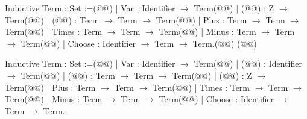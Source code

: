 Inductive Term : Set :=(@\vspace{-0.04cm}@)
| Var : Identifier $\rightarrow$ Term(@\vspace{-0.04cm}@)
| (@@) : Z $\rightarrow$ Term(@\vspace{-0.04cm}@)
| (@@) : Term $\rightarrow$ Term $\rightarrow$ Term(@\vspace{-0.04cm}@)
| Plus : Term $\rightarrow$ Term $\rightarrow$ Term(@\vspace{-0.04cm}@)
| Times : Term $\rightarrow$ Term $\rightarrow$ Term(@\vspace{-0.04cm}@)
| Minus : Term $\rightarrow$ Term $\rightarrow$ Term(@\vspace{-0.04cm}@)
| Choose : Identifier $\rightarrow$ Term $\rightarrow$ Term.(@\vspace{-0.04cm}@)
(@\vspace{-0.04cm}@)

Inductive Term : Set :=(@\vspace{-0.04cm}@)
| Var : Identifier $\rightarrow$ Term(@\vspace{-0.04cm}@)
| (@@) : Identifier $\rightarrow$ Term(@\vspace{-0.04cm}@)
| (@@) : Term $\rightarrow$ Term $\rightarrow$ Term(@\vspace{-0.04cm}@)
| (@@) : Z $\rightarrow$ Term(@\vspace{-0.04cm}@)
| Plus : Term $\rightarrow$ Term $\rightarrow$ Term(@\vspace{-0.04cm}@)
| Times : Term $\rightarrow$ Term $\rightarrow$ Term(@\vspace{-0.04cm}@)
| Minus : Term $\rightarrow$ Term $\rightarrow$ Term(@\vspace{-0.04cm}@)
| Choose : Identifier $\rightarrow$ Term $\rightarrow$ Term.
